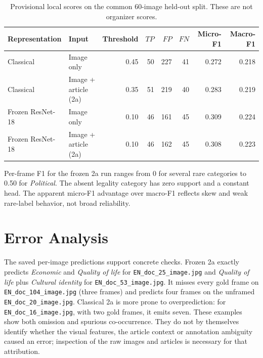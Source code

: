 \documentclass[11pt]{article}
\begin{document}
\begin{table}[ht]
\centering\small
\begin{tabular}{llrrrrrr}\toprule
Representation & Input & Threshold & $TP$ & $FP$ & $FN$ & Micro-F1 & Macro-F1\\\midrule
Classical & Image only & 0.45 & 50 & 227 & 41 & 0.272 & 0.218\\
Classical & Image + article (2a) & 0.35 & 51 & 219 & 40 & 0.283 & 0.219\\
Frozen ResNet-18 & Image only & 0.10 & 46 & 161 & 45 & 0.309 & 0.224\\
Frozen ResNet-18 & Image + article (2a) & 0.10 & 46 & 162 & 45 & 0.308 & 0.223\\\bottomrule
\end{tabular}
\caption{Provisional local scores on the common 60-image held-out split. These are not organizer scores.}\label{tab:results}
\end{table}

Per-frame F1 for the frozen 2a run ranges from 0 for several rare categories to 0.50 for \emph{Political}. The absent legality category has zero support and a constant head. The apparent micro-F1 advantage over macro-F1 reflects skew and weak rare-label behavior, not broad reliability.

\section{Error Analysis}\label{sec:errors}
The saved per-image predictions support concrete checks. Frozen 2a exactly predicts \emph{Economic} and \emph{Quality of life} for \texttt{EN\_doc\_25\_image.jpg} and \emph{Quality of life} plus \emph{Cultural identity} for \texttt{EN\_doc\_53\_image.jpg}. It misses every gold frame on \texttt{EN\_doc\_104\_image.jpg} (three frames) and predicts four frames on the unframed \texttt{EN\_doc\_20\_image.jpg}. Classical 2a is more prone to overprediction: for \texttt{EN\_doc\_16\_image.jpg}, with two gold frames, it emits seven. These examples show both omission and spurious co-occurrence. They do not by themselves identify whether the visual features, the article context or annotation ambiguity caused an error; inspection of the raw images and articles is necessary for that attribution.
\end{document}
